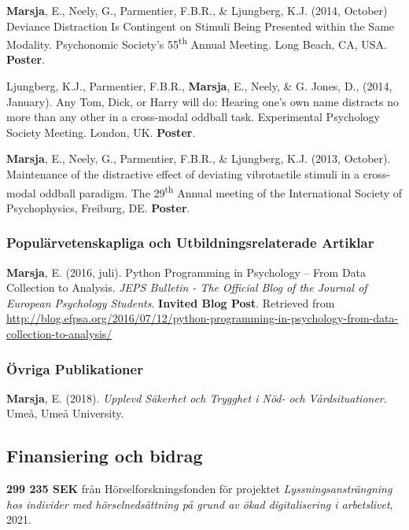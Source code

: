 \documentclass[]{article}
\begin{document}
\textbf{Marsja}, E., Neely, G., Parmentier, F.B.R., \& Ljungberg, K.J.
(2014, October) Deviance Distraction Is Contingent on Stimuli Being
Presented within the Same Modality. Psychonomic Society's
55\textsuperscript{th} Annual Meeting. Long Beach, CA, USA.
\textbf{Poster}.

Ljungberg, K.J., Parmentier, F.B.R., \textbf{Marsja}, E., Neely, \& G.
Jones, D., (2014, January). Any Tom, Dick, or Harry will do: Hearing
one's own name distracts no more than any other in a cross-modal oddball
task. Experimental Psychology Society Meeting. London, UK.
\textbf{Poster}.

\textbf{Marsja}, E., Neely, G., Parmentier, F.B.R., \& Ljungberg, K.J.
(2013, October). Maintenance of the distractive effect of deviating
vibrotactile stimuli in a cross-modal oddball paradigm. The
29\textsuperscript{th} Annual meeting of the International Society of
Psychophysics, Freiburg, DE. \textbf{Poster}.

\hypertarget{populuxe4rvetenskapliga-och-utbildningsrelaterade-artiklar}{%
\subsubsection{Populärvetenskapliga och Utbildningsrelaterade
Artiklar}\label{populuxe4rvetenskapliga-och-utbildningsrelaterade-artiklar}}

\textbf{Marsja}, E. (2016, juli). Python Programming in Psychology --
From Data Collection to Analysis. \emph{JEPS Bulletin - The Official
Blog of the Journal of European Psychology Students}. \textbf{Invited
Blog Post}. Retrieved from \sloppy
\url{http://blog.efpsa.org/2016/07/12/python-programming-in-psychology-from-data-collection-to-analysis/}

\hypertarget{uxf6vriga-publikationer}{%
\subsubsection{Övriga Publikationer}\label{uxf6vriga-publikationer}}

\textbf{Marsja}, E. (2018). \emph{Upplevd Säkerhet och Trygghet i Nöd-
och Vårdsituationer}. Umeå, Umeå University.

\hypertarget{finansiering-och-bidrag}{%
\subsection{Finansiering och bidrag}\label{finansiering-och-bidrag}}

\textbf{299 235 SEK} från Hörselforskningsfonden för projektet
\emph{Lyssningsansträngning hos individer med hörselnedsättning på grund
av ökad digitalisering i arbetslivet}, 2021.
\end{document}
